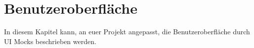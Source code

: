 
\chapter{Benutzeroberfläche}
\label{chap:ui}

In diesem Kapitel kann, an euer Projekt angepasst, die Benutzeroberfläche durch UI Mocks beschrieben werden.


